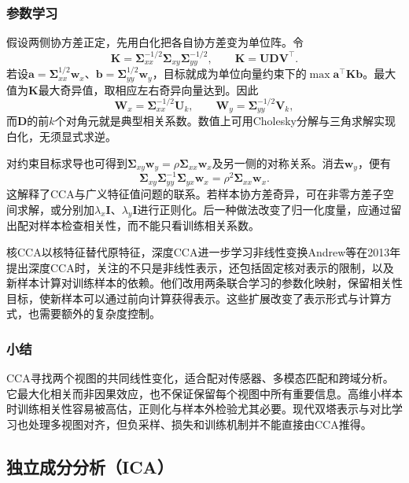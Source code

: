 \subsubsection{参数学习}
\label{sec:dim-cca-learning}

假设两侧协方差正定，先用白化把各自协方差变为单位阵。令
\[
  \bm{K}=\bm{\Sigma}_{xx}^{-1/2}
               \bm{\Sigma}_{xy}\bm{\Sigma}_{yy}^{-1/2},
  \qquad
  \bm{K}=\bm{U}\bm{D}\bm{V}^{\top}.
\]
若设$\bm{a}=\bm{\Sigma}_{xx}^{1/2}\bm{w}_x$、$\bm{b}=\bm{\Sigma}_{yy}^{1/2}\bm{w}_y$，目标就成为单位向量约束下的$\max\bm{a}^{\top}\bm{K}\bm{b}$。最大值为$\bm{K}$最大奇异值，取相应左右奇异向量达到。因此
\begin{equation}
  \bm{W}_x=\bm{\Sigma}_{xx}^{-1/2}\bm{U}_k,\qquad
  \bm{W}_y=\bm{\Sigma}_{yy}^{-1/2}\bm{V}_k,
  \label{eq:dim-cca-svd}
\end{equation}
而$\bm{D}$的前$k$个对角元就是典型相关系数。数值上可用Cholesky分解与三角求解实现白化，无须显式求逆。

对约束目标求导也可得到$\bm{\Sigma}_{xy}\bm{w}_y=\rho\bm{\Sigma}_{xx}\bm{w}_x$及另一侧的对称关系。消去$\bm{w}_y$，便有
\[
  \bm{\Sigma}_{xy}\bm{\Sigma}_{yy}^{-1}
       \bm{\Sigma}_{yx}\bm{w}_x
  =\rho^2\bm{\Sigma}_{xx}\bm{w}_x.
\]
这解释了CCA与广义特征值问题的联系。若样本协方差奇异，可在非零方差子空间求解，或分别加$\lambda_x\bm{I}$、$\lambda_y\bm{I}$进行正则化。后一种做法改变了归一化度量，应通过留出配对样本检查相关性，而不能只看训练相关系数。

核CCA以核特征替代原特征，深度CCA进一步学习非线性变换Andrew等在2013年提出深度CCA时，关注的不只是非线性表示，还包括固定核对表示的限制，以及新样本计算对训练样本的依赖。他们改用两条联合学习的参数化映射，保留相关性目标，使新样本可以通过前向计算获得表示。这些扩展改变了表示形式与计算方式，也需要额外的复杂度控制。

\subsubsection{小结}
\label{sec:dim-cca-summary}

CCA寻找两个视图的共同线性变化，适合配对传感器、多模态匹配和跨域分析。它最大化相关而非因果效应，也不保证保留每个视图中所有重要信息。高维小样本时训练相关性容易被高估，正则化与样本外检验尤其必要。现代双塔表示与对比学习也处理多视图对齐，但负采样、损失和训练机制并不能直接由CCA推得。

\subsection{独立成分分析（ICA）}
\label{sec:dim-ica}

